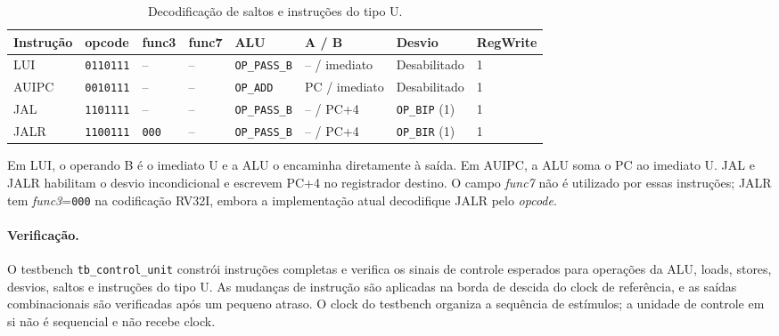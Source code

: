 \begin{table}[!htb]
\centering
\small
\caption{Decodificação de saltos e instruções do tipo U.}
\label{tab:control-unit-jump-upper-decode}
\begin{tabular}{llllllll}
\toprule
\textbf{Instrução} & \textbf{opcode} & \textbf{func3} & \textbf{func7} & \textbf{ALU} & \textbf{A / B} & \textbf{Desvio} & \textbf{RegWrite} \\
\midrule
LUI   & \texttt{0110111} & -- & -- & \texttt{OP\_PASS\_B} & -- / imediato & Desabilitado & 1 \\
AUIPC & \texttt{0010111} & -- & -- & \texttt{OP\_ADD}    & PC / imediato & Desabilitado & 1 \\
JAL   & \texttt{1101111} & -- & -- & \texttt{OP\_PASS\_B} & -- / PC+4 & \texttt{OP\_BIP} (1) & 1 \\
JALR  & \texttt{1100111} & \texttt{000} & -- & \texttt{OP\_PASS\_B} & -- / PC+4 & \texttt{OP\_BIR} (1) & 1 \\
\bottomrule
\end{tabular}
\end{table}

Em LUI, o operando B é o imediato U e a ALU o encaminha diretamente à saída. Em AUIPC, a ALU soma o PC ao imediato U. JAL e JALR habilitam o desvio incondicional e escrevem PC+4 no registrador destino. O campo \textit{func7} não é utilizado por essas instruções; JALR tem \textit{func3}=\texttt{000} na codificação RV32I, embora a implementação atual decodifique JALR pelo \textit{opcode}.

\paragraph{Verificação.}
O testbench \texttt{tb\_control\_unit} constrói instruções completas e verifica os sinais de controle esperados para operações da ALU, loads, stores, desvios, saltos e instruções do tipo U. As mudanças de instrução são aplicadas na borda de descida do clock de referência, e as saídas combinacionais são verificadas após um pequeno atraso. O clock do testbench organiza a sequência de estímulos; a unidade de controle em si não é sequencial e não recebe clock.

